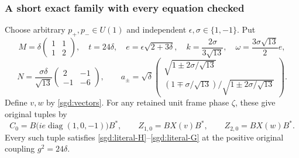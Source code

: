 \subsubsection{A short exact family with every equation checked}

\begin{proposition}\label{sgd:explicit-point}
Choose arbitrary $p_+,p_-\in U(1)$ and independent
$\epsilon,\sigma\in\{1,-1\}$. Put
\[
 M=\delta\begin{pmatrix}1&1\\1&2\end{pmatrix},\quad
 t=24\delta,\quad
 e=\epsilon\sqrt{2+3\delta},\quad
 k=\frac{2\sigma}{3\sqrt{13}},\quad
 \omega=\frac{3\sigma\sqrt{13}}2e,
\]
\[
 N=\frac{\sigma\delta}{\sqrt{13}}
        \begin{pmatrix}2&-1\\-1&-6\end{pmatrix},\qquad
 a_\pm=\sqrt\delta\begin{pmatrix}
 \sqrt{1\pm2\sigma/\sqrt{13}}\\[1mm]
 (1\mp\sigma/\sqrt{13})/\sqrt{1\pm2\sigma/\sqrt{13}}
 \end{pmatrix}.
\]
Define $v,w$ by \eqref{sgd:vectors}. For any retained unit frame
phase $\zeta$, these give original tuples by
\[
 C_0=B\bigl(ie\operatorname{diag}(1,0,-1)\bigr)B^*,\qquad
 Z_{1,0}=BX(v)B^*,\qquad Z_{2,0}=BX(w)B^*.
\]
Every such tuple satisfies \eqref{sgd:literal-H}--\eqref{sgd:literal-G}
at the positive original coupling $g^2=24\delta$.
\end{proposition}
